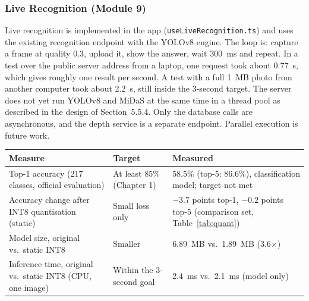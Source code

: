 \subsubsection{Live Recognition (Module 9)}
Live recognition is implemented in the app (\texttt{useLiveRecognition.ts}) and uses
the existing recognition endpoint with the YOLOv8 engine. The loop is: capture a
frame at quality 0.3, upload it, show the answer, wait 300~ms and repeat.
In a test over the public server address from a laptop, one request took about
0.77~s, which gives roughly one result per second. A test with a full 1~MB photo
from another computer took about 2.2~s, still inside the 3-second target.
The server does not yet run YOLOv8 and MiDaS at the same time in a thread pool
as described in the design of Section~5.5.4. Only the database calls are
asynchronous, and the depth service is a separate endpoint. Parallel execution is
future work.


\begin{tabular}{|p{5cm}|p{3.2cm}|p{5.2cm}|}
\hline
\textbf{Measure} & \textbf{Target} & \textbf{Measured} \\
\hline
Top-1 accuracy (217 classes, official evaluation) & At least 85\% (Chapter 1) & 58.5\% (top-5: 86.6\%), classification model; target not met \\
\hline
Accuracy change after INT8 quantisation (static) & Small loss only & $-3.7$ points top-1, $-0.2$ points top-5 (comparison set, Table~\ref{tab:quant}) \\
\hline
Model size, original vs.\ static INT8 & Smaller & 6.89~MB vs.\ 1.89~MB (3.6$\times$) \\
\hline
Inference time, original vs.\ static INT8 (CPU, one image) & Within the 3-second goal & 2.4~ms vs.\ 2.1~ms (model only) \\
\hline
\end{tabular}


